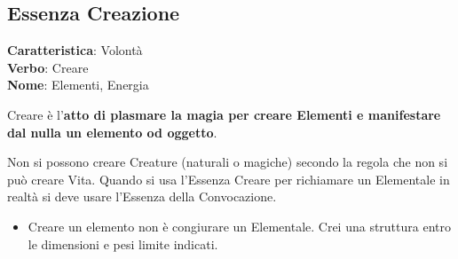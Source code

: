 \documentclass[a4paper,11pt,twoside,openany]{book}
\begin{document}
\pagebreak

\subsection{Essenza Creazione}

\textbf{Caratteristica}: Volontà\\
\textbf{Verbo}: Creare\\
\textbf{Nome}: Elementi, Energia\\


\label{essenza-creazione---volonta}

Creare è l'\textbf{atto di plasmare la magia per creare Elementi e manifestare dal nulla un elemento od oggetto}.

Non si possono creare Creature (naturali o magiche) secondo la regola che non si può creare Vita. Quando si usa l'Essenza Creare per richiamare un Elementale in realtà si deve usare l'Essenza della Convocazione.

\begin{itemize}
	\item Creare un elemento non è congiurare un Elementale. Crei una struttura entro le dimensioni e pesi limite indicati.
\end{itemize}
\end{document}
